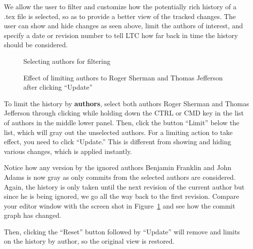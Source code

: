 We allow the user to filter and customize how the potentially rich history of a .tex file is selected, so as to provide a better view of the tracked changes.  The user can show and hide changes as seen above, limit the authors of interest, and specify a date or revision number to tell LTC how far back in time the history should be considered.


\begin{figure}
\centering
  \begin{minipage}[t]{0.35\linewidth}
  \centering
  \caption{Selecting authors for filtering} \label{fig:editor-select-authors}
  \end{minipage}%
\hspace{0.04\linewidth}%
  \begin{minipage}[t]{0.61\linewidth}
  \centering
  \caption{Effect of limiting authors to Roger Sherman and Thomas Jefferson after clicking ``Update''} \label{fig:editor-limit-authors}
  \end{minipage}  
\end{figure}
To limit the history by \textbf{authors}, select both authors Roger Sherman and Thomas Jefferson through clicking while holding down the CTRL or CMD key in the list of authors in the middle lower panel.  Then, click the button ``Limit'' below the list, which will gray out the unselected authors.  For a limiting action to take effect, you need to click ``Update.''  This is different from showing and hiding various changes, which is applied instantly.

Notice how any version by the ignored authors Benjamin Franklin and John Adams is now gray as only commits from the selected authors are considered.  Again, the history is only taken until the next revision of the current author but since he is being ignored, we go all the way back to the first revision. Compare your editor window with the screen shot in Figure~\ref{fig:editor-limit-authors} and see how the commit graph has changed.

Then, clicking the ``Reset'' button followed by ``Update'' will remove and limits on the history by author, so the original view is restored.

